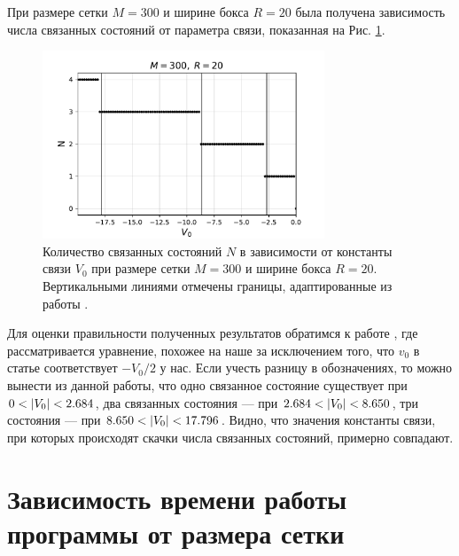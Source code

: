 \documentclass[10pt]{article}
\begin{document}
При размере сетки $M=300$ и ширине бокса $R=20$ была получена зависимость числа связанных состояний от параметра связи, показанная на Рис. \ref{fig:n_vs_v0}.
\begin{figure}[htbp]
    \centering
    \includegraphics[width=0.75\textwidth]{../figures/num_eigen_vs_v0}
    \caption{Количество связанных состояний $N$ в зависимости от константы связи $V_0$ при размере сетки $M=300$ и ширине бокса $R=20$. Вертикальными линиями отмечены границы, адаптированные из работы \cite{article}.}
    \label{fig:n_vs_v0}
\end{figure}
Для оценки правильности полученных результатов обратимся к работе \cite{article}, где рассматривается уравнение, похожее на наше за исключением того, что $v_0$ в статье соответствует $-V_0/2$ у нас. Если учесть разницу в обозначениях, то можно вынести из данной работы, что одно связанное состояние существует при $0 < \abs{V_0} < 2.684$, два связанных состояния --- при $2.684 < \abs{V_0} < 8.650$, три состояния --- при $8.650 < \abs{V_0} < 17.796$. Видно, что значения константы связи, при которых происходят скачки числа связанных состояний, примерно совпадают.

\section{Зависимость времени работы программы от размера сетки}
\end{document}
